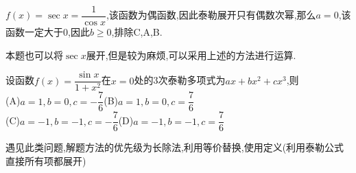 \documentclass[9pt a4paper, oneside, UTF8]{ctexbook}
\begin{document}
\begin{sloppypar}
    \begin{solution}
        $f(x)=\sec x=\dfrac{1}{\cos x}$,该函数为偶函数,因此泰勒展开只有偶数次幂,那么$a=0$,该函数一定大于0,因此$b \geq 0$,排除C,A,B.
    \end{solution}
    \begin{note}
        本题也可以将$\sec x$展开,但是较为麻烦,可以采用上述的方法进行运算.
    \end{note}
    \begin{problem}
        设函数$f(x)=\dfrac{\sin x}{1+x^2}$在$x=0$处的3次泰勒多项式为$ax + b x ^ 2 + c x ^ 3 $,则
        \\(A)$a=1,b=0,c=-\dfrac{7}{6}$\quad (B)$a=1,b=0,c=\dfrac{7}{6}$\\ (C)$a=-1,b=-1,c=-\dfrac{7}{6}$\quad (D)$a=-1,b=-1,c=\dfrac{7}{6}$
    \end{problem}
    \begin{note}
        遇见此类问题,解题方法的优先级为长除法,利用等价替换,使用定义(利用泰勒公式直接所有项都展开)
    \end{note}

\end{sloppypar}
\end{document}
